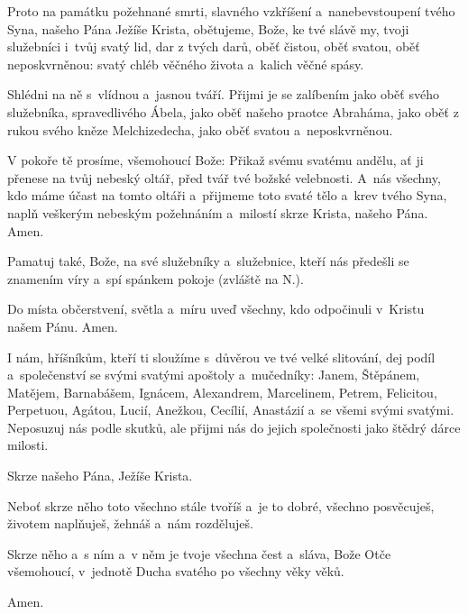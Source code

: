 Proto na památku požehnané smrti, slavného vzkříšení a~nanebevstoupení tvého Syna, našeho Pána Ježíše Krista, obětujeme, Bože, ke tvé slávě my, tvoji služebníci i~tvůj svatý lid, dar z tvých darů, oběť čistou, oběť svatou, oběť neposkvrněnou: svatý chléb věčného života a~kalich věčné spásy.

Shlédni na ně s~vlídnou a~jasnou tváří. Přijmi je se zalíbením jako oběť svého služebníka, spravedlivého Ábela, jako oběť našeho praotce Abraháma, jako oběť z rukou svého kněze Melchizedecha, jako oběť svatou a~neposkvrněnou.

V pokoře tě prosíme, všemohoucí Bože: Přikaž svému svatému andělu, ať ji přenese na tvůj nebeský oltář, před tvář tvé božské velebnosti. A~nás všechny, kdo máme účast na tomto oltáři a~přijmeme toto svaté tělo a~krev tvého Syna, naplň veškerým nebeským požehnáním a~milostí skrze Krista, našeho Pána. Amen.

Pamatuj také, Bože, na své služebníky a~služebnice, kteří nás předešli se znamením víry a~spí spánkem pokoje (zvláště na {\color{red}N.}).

Do místa občerstvení, světla a~míru uveď všechny, kdo odpočinuli v~Kristu našem Pánu. Amen.

I nám, hříšníkům, kteří ti sloužíme s~důvěrou ve tvé velké slitování, dej podíl a~společenství se svými svatými apoštoly a~mučedníky: Janem, Štěpánem, Matějem, Barnabášem, Ignácem, Alexandrem, Marcelinem, Petrem, Felicitou, Perpetuou, Agátou, Lucií, Anežkou, Cecílií, Anastázií a~se všemi svými svatými. Neposuzuj nás podle skutků, ale přijmi nás do jejich společnosti jako štědrý dárce milosti.

Skrze našeho Pána, Ježíše Krista.

Neboť skrze něho toto všechno stále tvoříš a~je to dobré, všechno posvěcuješ, životem naplňuješ, žehnáš a~nám rozděluješ.

Skrze něho a~s ním a~v něm je tvoje všechna čest a~sláva, Bože Otče všemohoucí, v~jednotě Ducha svatého po všechny věky věků.

\Rbardot{} Amen.
